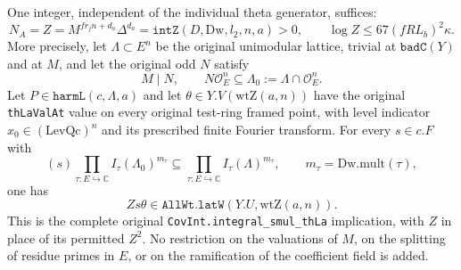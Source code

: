 \begin{theorem}
\label{thm:actual-theta-denominator}
One integer, independent of the individual theta generator, suffices:
\begin{equation}\label{eq:actual-theta-clearing-integer}
 N_A=Z= M^{f r_j n+d_a}\Delta^{d_a}
       =\texttt{intZ}(D,\mathrm{Dw},l_2,n,a)>0,
 \qquad
 \log Z\le67(fRL_b)^2\kappa.
\end{equation}
More precisely, let $\Lambda\subset E^n$ be the original unimodular
lattice, trivial at $\texttt{badC}(Y)$ and at $M$, and let the original
odd $N$ satisfy
\[
 M\mid N,\qquad N\mathcal O_E^n\subseteq
 \Lambda_0:=\Lambda\cap\mathcal O_E^n.
\]
Let $P\in\texttt{harmL}(c,\Lambda,a)$ and let
$\theta\in Y.V(\mathrm{wtZ}(a,n))$ have the original
\texttt{thLaValAt} value on every original test-ring framed point,
with level indicator $x_0\in(\mathrm{LevQc})^n$ and its prescribed
finite Fourier transform.  For every $s\in c.F$ with
\begin{equation}\label{eq:actual-theta-determinant-scalar}
 (s)\prod_{\tau:E\hookrightarrow\mathbb C}
          I_\tau(\Lambda_0)^{m_\tau}
       \subseteq
       \prod_{\tau:E\hookrightarrow\mathbb C}
          I_\tau(\Lambda)^{m_\tau},
 \qquad m_\tau=\mathrm{Dw.mult}(\tau),
\end{equation}
one has
\[
                 Zs\theta\in\texttt{AllWt.latW}
                          (Y.U,\mathrm{wtZ}(a,n)).
\]
This is the complete original
\texttt{CovInt.integral\_smul\_thLa} implication, with $Z$ in place
of its permitted $Z^2$.  No restriction on the valuations of $M$,
on the splitting of residue primes in $E$, or on the ramification of
the coefficient field is added.
\end{theorem}

